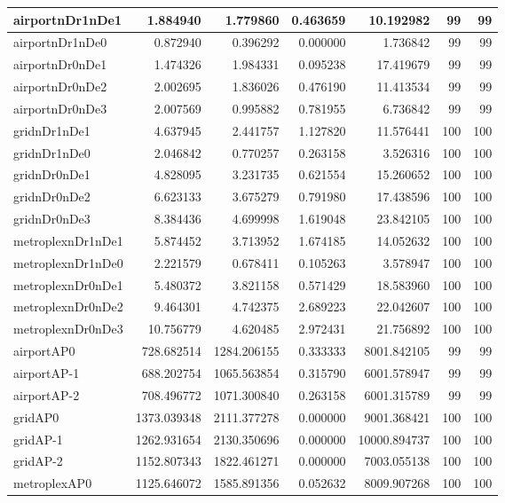 \begin{longtable}{|l|r|r|r|r|r|r|}
\endlastfoot
airportnDr1nDe1 & 1.884940 & 1.779860 & 0.463659 & 10.192982 & 99 & 99 \\ \hline
airportnDr1nDe0 & 0.872940 & 0.396292 & 0.000000 & 1.736842 & 99 & 99 \\ \hline
airportnDr0nDe1 & 1.474326 & 1.984331 & 0.095238 & 17.419679 & 99 & 99 \\ \hline
airportnDr0nDe2 & 2.002695 & 1.836026 & 0.476190 & 11.413534 & 99 & 99 \\ \hline
airportnDr0nDe3 & 2.007569 & 0.995882 & 0.781955 & 6.736842 & 99 & 99 \\ \hline
gridnDr1nDe1 & 4.637945 & 2.441757 & 1.127820 & 11.576441 & 100 & 100 \\ \hline
gridnDr1nDe0 & 2.046842 & 0.770257 & 0.263158 & 3.526316 & 100 & 100 \\ \hline
gridnDr0nDe1 & 4.828095 & 3.231735 & 0.621554 & 15.260652 & 100 & 100 \\ \hline
gridnDr0nDe2 & 6.623133 & 3.675279 & 0.791980 & 17.438596 & 100 & 100 \\ \hline
gridnDr0nDe3 & 8.384436 & 4.699998 & 1.619048 & 23.842105 & 100 & 100 \\ \hline
metroplexnDr1nDe1 & 5.874452 & 3.713952 & 1.674185 & 14.052632 & 100 & 100 \\ \hline
metroplexnDr1nDe0 & 2.221579 & 0.678411 & 0.105263 & 3.578947 & 100 & 100 \\ \hline
metroplexnDr0nDe1 & 5.480372 & 3.821158 & 0.571429 & 18.583960 & 100 & 100 \\ \hline
metroplexnDr0nDe2 & 9.464301 & 4.742375 & 2.689223 & 22.042607 & 100 & 100 \\ \hline
metroplexnDr0nDe3 & 10.756779 & 4.620485 & 2.972431 & 21.756892 & 100 & 100 \\ \hline
airportAP0 & 728.682514 & 1284.206155 & 0.333333 & 8001.842105 & 99 & 99 \\ \hline
airportAP-1 & 688.202754 & 1065.563854 & 0.315790 & 6001.578947 & 99 & 99 \\ \hline
airportAP-2 & 708.496772 & 1071.300840 & 0.263158 & 6001.315789 & 99 & 99 \\ \hline
gridAP0 & 1373.039348 & 2111.377278 & 0.000000 & 9001.368421 & 100 & 100 \\ \hline
gridAP-1 & 1262.931654 & 2130.350696 & 0.000000 & 10000.894737 & 100 & 100 \\ \hline
gridAP-2 & 1152.807343 & 1822.461271 & 0.000000 & 7003.055138 & 100 & 100 \\ \hline
metroplexAP0 & 1125.646072 & 1585.891356 & 0.052632 & 8009.907268 & 100 & 100 \\ \hline

\end{longtable}

